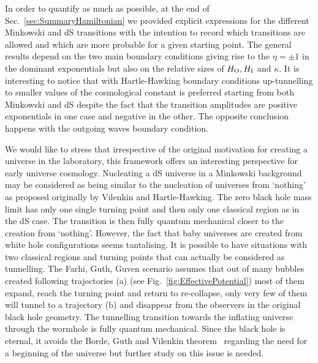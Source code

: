 \documentclass[11pt,a4paper]{article}
\begin{document}
In order to quantify as much as possible, at the end of Sec.~\ref{sec:SummaryHamiltonian} we provided explicit expressions for the different Minkowski and dS transitions with the intention to record which transitions are allowed and which are more probable for a given starting point. The general results depend on the two main boundary conditions giving rise to the $\eta=\pm 1$ in the dominant exponentials but also on the relative sizes of $H_{\rm O}, H_{\rm I}$ and $\kappa$. It is interesting to notice that with Hartle-Hawking boundary conditions up-tunnelling to smaller values of the cosmological constant is preferred starting from both Minkowski and dS despite the fact that the transition amplitudes are positive exponentials in one case and negative in the other. The opposite conclusion happens with the outgoing waves boundary condition. 

We would like to stress that irrespective of the original motivation for creating a universe in the  laboratory, this framework offers an interesting perspective for  early universe cosmology. Nucleating a dS universe in a Minkowski background may be considered as  being similar to the nucleation of universes from `nothing' as proposed originally by Vilenkin and Hartle-Hawking. The zero black hole mass limit has only one single turning point and then only one classical region as in the dS case. The transition is then fully quantum mechanical closer to the creation from `nothing'. However, the fact that baby universes are created from white hole configurations seems tantalising. It is possible to have situations with two classical regions and turning points that can actually be considered as tunnelling. The Farhi, Guth, Guven scenario assumes that out of many bubbles created following trajectories (a) (see Fig.~\ref{fig:EffectivePotential}) most of them expand, reach the turning point and return to re-collapse, only  very few of them will tunnel to a trajectory (b) and disappear from the observers in the original black hole geometry. The tunnelling transition towards the inflating universe through the wormhole is fully quantum mechanical. Since the black hole is eternal,  it avoids the Borde, Guth and Vilenkin theorem~\cite{Borde:2001nh} regarding the need for a beginning of the universe but further study on this issue is needed. 
\end{document}
